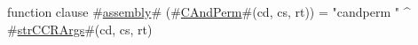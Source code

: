 function clause #\hyperref[sailMIPSzassembly]{assembly}# (#\hyperref[sailMIPSzCAndPerm]{CAndPerm}#(cd, cs, rt)) = "candperm " ^ #\hyperref[sailMIPSzstrCCRArgs]{strCCRArgs}#(cd, cs, rt)
